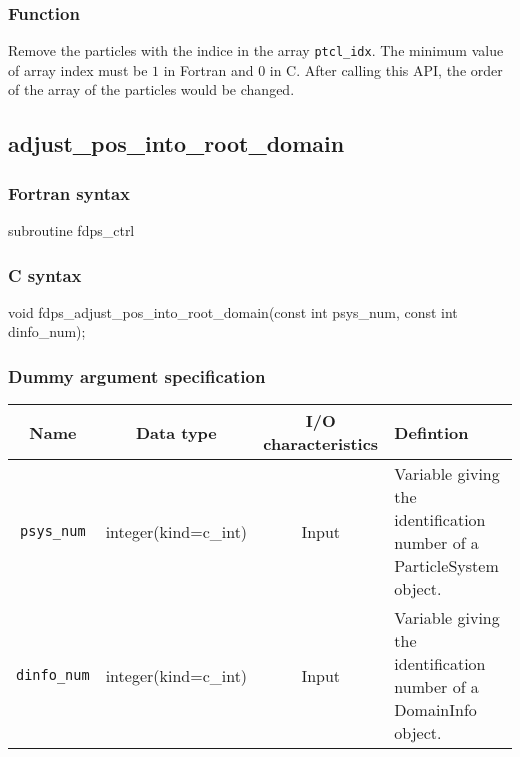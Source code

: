 \subsubsection*{Function}
Remove the particles with the indice in the array {\tt ptcl\_idx}. The minimum value of array index must be $1$ in Fortran and $0$ in C. After calling this API, the order of the array of the particles would be changed.

\clearpage

\subsection{adjust\_pos\_into\_root\_domain}
\subsubsection*{Fortran syntax}
\begin{screen}
\begin{spverbatim}
subroutine fdps_ctrl%
\end{spverbatim}
\end{screen}

\subsubsection*{C syntax}
\begin{screen}
\begin{spverbatim}
void fdps_adjust_pos_into_root_domain(const int psys_num,
                                      const int dinfo_num);
\end{spverbatim}
\end{screen}

\subsubsection*{Dummy argument specification}
\begin{table}[h]
\begin{tabularx}{\linewidth}{cccX}
\toprule
\rowcolor{Snow2}
Name & Data type & I/O characteristics & Defintion \\
\midrule
\texttt{psys\_num} & integer(kind=c\_int) & Input & Variable giving the identification number of a ParticleSystem object. \\
\texttt{dinfo\_num} & integer(kind=c\_int) & Input & Variable giving the identification number of a DomainInfo object. \\
\bottomrule

\end{tabularx}
\end{table}

